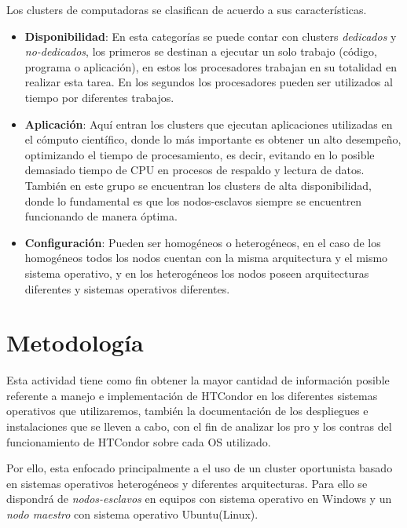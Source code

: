 Los clusters de computadoras se clasifican de acuerdo a sus características.
\begin{itemize}
	\item \textbf{Disponibilidad}: En esta categorías se puede contar con clusters \textit{dedicados} y \textit{no-dedicados}, los primeros se destinan a ejecutar un solo trabajo (código, programa o aplicación), en estos los procesadores trabajan en su totalidad en realizar esta tarea. En los segundos los procesadores pueden ser utilizados al tiempo por diferentes trabajos.
    \item \textbf{Aplicación}: Aquí entran los clusters que ejecutan aplicaciones utilizadas en el cómputo científico, donde lo más importante es obtener un alto desempeño, optimizando el tiempo de procesamiento, es decir, evitando en lo posible demasiado tiempo de CPU en procesos de respaldo y lectura de datos. También en este grupo se encuentran los clusters de alta disponibilidad, donde lo fundamental es que los nodos-esclavos siempre se encuentren funcionando de manera óptima.
    \item \textbf{Configuración}: Pueden ser homogéneos o heterogéneos, en el caso de los homogéneos todos los nodos cuentan con la misma arquitectura y el mismo sistema operativo, y en los heterogéneos los nodos poseen arquitecturas diferentes y sistemas operativos diferentes.
\end{itemize}



\section{Metodología}

Esta actividad tiene como fin obtener la mayor cantidad de información posible referente a manejo e implementación de HTCondor en los diferentes sistemas operativos que utilizaremos, también la documentación de los despliegues e instalaciones que se lleven a cabo, con el fin de analizar los pro y los contras del funcionamiento de HTCondor sobre cada OS utilizado.

Por ello, esta enfocado principalmente a el uso de un cluster oportunista basado en sistemas operativos heterogéneos y diferentes arquitecturas. Para ello se dispondrá de \textit{nodos-esclavos} en equipos con sistema operativo en Windows y un \textit{nodo maestro} con sistema operativo Ubuntu(Linux).

